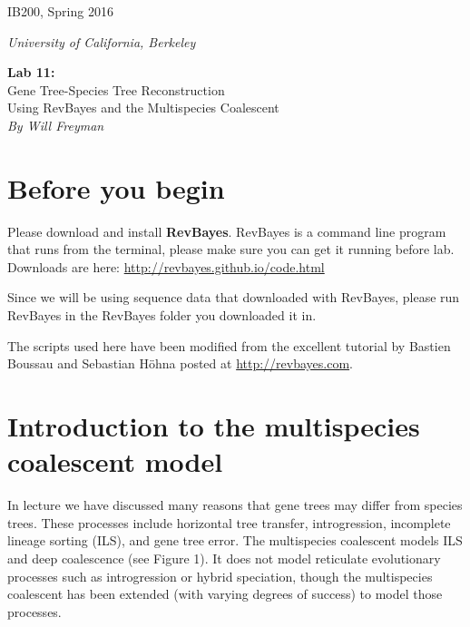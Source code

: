 \documentclass[11pt]{article}
\begin{document}
\noindent
\large
\begin{minipage}{0.5\textwidth}
\begin{flushleft} 
IB200, Spring 2016
\end{flushleft}
\end{minipage}
\begin{minipage}{0.5\textwidth}
\begin{flushright} 
\textit{University of California, Berkeley}
\end{flushright}
\end{minipage}

\vspace{0.5cm}


\begin{center}
\Large \textbf{Lab 11:} \\
Gene Tree-Species Tree Reconstruction \\ 
Using RevBayes and the Multispecies Coalescent \\
\normalsize
\textit{By Will Freyman} \\
\end{center}

\vspace{0.5cm}

\section{Before you begin}

Please download and install \textbf{RevBayes}.
RevBayes is a command line program that runs from the terminal,
please make sure you can get it running before lab.
Downloads are here: \url{http://revbayes.github.io/code.html}

Since we will be using sequence data that downloaded with RevBayes,
please run RevBayes in the RevBayes folder you downloaded it in.

The scripts used here have been modified from the excellent tutorial by Bastien Boussau and Sebastian H{\"o}hna 
posted at \url{http://revbayes.com}.

\section{Introduction to the multispecies coalescent model}

In lecture we have discussed many reasons that gene trees may differ from species trees.
These processes include horizontal tree transfer, introgression,
incomplete lineage sorting (ILS), and gene tree error.
The multispecies coalescent models ILS and deep coalescence (see Figure 1).
It does not model reticulate evolutionary processes such as introgression or hybrid speciation,
though the multispecies coalescent has been extended (with varying degrees of success) to model those processes.
\end{document}
